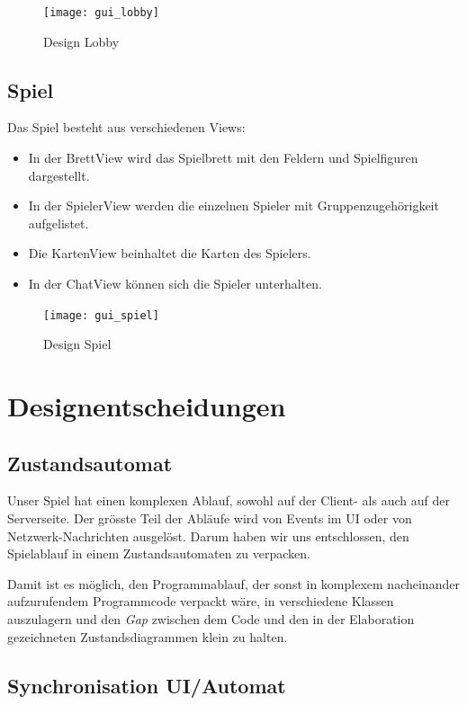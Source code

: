 \documentclass[12pt,halfparskip]{scrartcl}
\begin{document}
\begin{figure}[h]
	\centering
	\texttt{[image: gui\_lobby]}
	\caption{Design Lobby}
	\label{fig:gui_lobby}
\end{figure}

\clearpage

\subsection{Spiel}
\label{externes_design_spielbrett}

Das Spiel besteht aus verschiedenen Views:
\begin{itemize}
	\item In der BrettView wird das Spielbrett mit den Feldern und Spielfiguren dargestellt.
	\item In der SpielerView werden die einzelnen Spieler mit Gruppenzugehörigkeit aufgelistet.
	\item Die KartenView beinhaltet die Karten des Spielers.
	\item In der ChatView können sich die Spieler unterhalten.
\end{itemize}

\begin{figure}[h]
	\centering
	\texttt{[image: gui\_spiel]}
	\caption{Design Spiel}
	\label{fig:gui_spiel}
\end{figure}

\clearpage
\section{Designentscheidungen}

\subsection{Zustandsautomat}
Unser Spiel hat einen komplexen Ablauf, sowohl auf der Client- als auch auf der Serverseite. Der grösste Teil der Abläufe wird von Events im UI oder von Netzwerk-Nachrichten ausgelöst. Darum haben wir uns entschlossen, den Spielablauf in einem Zustandsautomaten zu verpacken.

Damit ist es möglich, den Programmablauf, der sonst in komplexem nacheinander aufzurufendem Programmcode verpackt wäre, in verschiedene Klassen auszulagern und den \emph{Gap} zwischen dem Code und den in der Elaboration gezeichneten Zustandsdiagrammen klein zu halten.

\subsection{Synchronisation UI/Automat}
\end{document}
